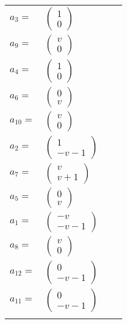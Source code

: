 \documentclass[1p]{elsarticle_modified}
\theoremstyle{definition}
\begin{document}
\begin{tabular}{m{7pt} m{180pt} m{7pt} m{180pt} }
\flushright $a_{3}=$&$\begin{pmatrix}1\\0\end{pmatrix}$ \\
\flushright $a_{9}=$&$\begin{pmatrix}v\\0\end{pmatrix}$ \\
\flushright $a_{4}=$&$\begin{pmatrix}1\\0\end{pmatrix}$ \\
\flushright $a_{6}=$&$\begin{pmatrix}0\\v\end{pmatrix}$ \\
\flushright $a_{10}=$&$\begin{pmatrix}v\\0\end{pmatrix}$ \\
\flushright $a_{2}=$&$\begin{pmatrix}1\\- v-1\end{pmatrix}$ \\
\flushright $a_{7}=$&$\begin{pmatrix}v\\v+1\end{pmatrix}$ \\
\flushright $a_{5}=$&$\begin{pmatrix}0\\v\end{pmatrix}$ \\
\flushright $a_{1}=$&$\begin{pmatrix}- v\\- v-1\end{pmatrix}$ \\
\flushright $a_{8}=$&$\begin{pmatrix}v\\0\end{pmatrix}$ \\
\flushright $a_{12}=$&$\begin{pmatrix}0\\- v-1\end{pmatrix}$ \\
\flushright $a_{11}=$&$\begin{pmatrix}0\\- v-1\end{pmatrix}$\\&\end{tabular}
\end{document}
